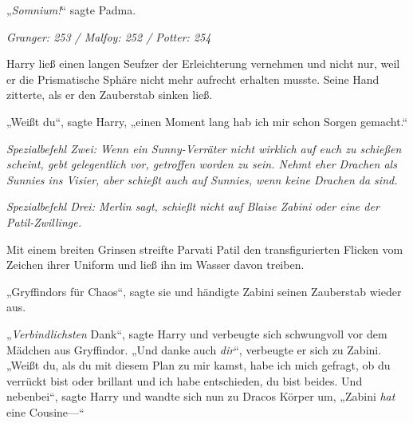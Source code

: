 „\emph{Somnium!}“ sagte Padma.

\later

\emph{Granger: 253 / Malfoy: 252 / Potter: 254}

Harry ließ einen langen Seufzer der Erleichterung vernehmen und nicht nur, weil er die Prismatische Sphäre nicht mehr aufrecht erhalten musste. Seine Hand zitterte, als er den Zauberstab sinken ließ.

„Weißt du“, sagte Harry, „einen Moment lang hab ich mir schon Sorgen gemacht.“

\emph{Spezialbefehl Zwei: Wenn ein Sunny-Verräter nicht wirklich auf euch zu schießen scheint, gebt gelegentlich vor, getroffen worden zu sein. Nehmt eher Drachen als Sunnies ins Visier, aber schießt auch auf Sunnies, wenn keine Drachen da sind.}

\emph{Spezialbefehl Drei: Merlin sagt, schießt nicht auf Blaise Zabini oder eine der Patil-Zwillinge.}

Mit einem breiten Grinsen streifte Parvati Patil den transfigurierten Flicken vom Zeichen ihrer Uniform und ließ ihn im Wasser davon treiben.

„Gryffindors für Chaos“, sagte sie und händigte Zabini seinen Zauberstab wieder aus.

„\emph{Verbindlichsten} Dank“, sagte Harry und verbeugte sich schwungvoll vor dem Mädchen aus Gryffindor. „Und danke auch \emph{dir}“, verbeugte er sich zu Zabini. „Weißt du, als du mit diesem Plan zu mir kamst, habe ich mich gefragt, ob du verrückt bist oder brillant und ich habe entschieden, du bist beides. Und nebenbei“, sagte Harry und wandte sich nun zu Dracos Körper um, „Zabini \emph{hat} eine Cousine—“

